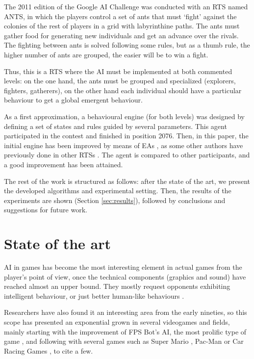 \documentclass[runningheads]{llncs}
\begin{document}
The 2011 edition of the Google AI Challenge \cite{webGAIC} was conducted with an RTS named ANTS, in which the players control a set of ants that must `fight' against the colonies of the rest of players in a grid with labyrinthine paths. The ants must gather food for generating new individuals and get an advance over the rivals. The fighting between ants is solved following some rules, but as a thumb rule, the higher number of ants are grouped, the easier will be to win a fight.

Thus, this is a RTS where the AI must be implemented at both commented levels: on the one hand, the ants must be grouped and specialized (explorers, fighters, gatherers), on the other hand each individual should have a particular behaviour to get a global emergent behaviour.

As a first approximation, a behavioural engine (for both levels) was designed by defining a set of states and rules guided by several parameters. This agent participated in the contest and finished in position 2076. %
Then, in this paper, the initial engine has been improved by means of EAs \cite{INTROEIBEN}, as some other authors have previously done in other RTSs 
. 
The agent is compared to other participants, and a good improvement has been attained.




The rest of the work is structured as follows: after the state of
the art, we present the developed algorithms and experimental setting. 
Then, the results of the experiments are shown (Section \ref{sec:results}), followed by conclusions and suggestions for future work.


\section{State of the art}
\label{sec:soa}



AI in games has become the most interesting element in actual games from the player's point of view, once the technical components (graphics and sound) have reached almost an upper bound. They mostly request opponents exhibiting intelligent behaviour, or just better human-like behaviours \cite{artifical-stupidity-game-wisdom2-2004}.

Researchers have also found it an interesting area from the early nineties, so this scope has presented an exponential grown in several videogames and fields, mainly starting with the improvement of FPS Bot's AI, the most prolific type of game \cite{laird2001using,cooperativebots_CIG2010}, and following with several games such as Super Mario \cite{Togelius_SuperMario}, Pac-Man \cite{Pac-MAnt_CIG2010} or Car Racing Games \cite{CarRacing_Pelta09}, to cite a few.
\end{document}

